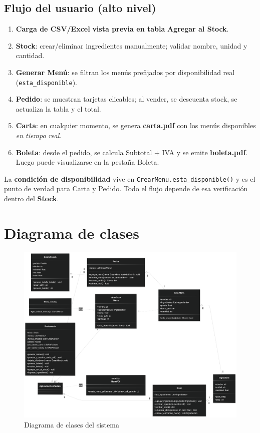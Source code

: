 \documentclass[12pt,a4paper]{article}
\newcommand{\codehl}[1]{\colorbox{yellow!30}{\texttt{#1}}}
\begin{document}
\subsection*{Flujo del usuario (alto nivel)}
\begin{enumerate}[leftmargin=*]
  \item \textbf{Carga de CSV/Excel} \rightarrow \textbf{vista previa en tabla} \rightarrow \textbf{Agregar al Stock}.
  \item \textbf{Stock}: crear/eliminar ingredientes manualmente; validar nombre, unidad y cantidad.
  \item \textbf{Generar Menú}: se filtran los menús prefijados por disponibilidad real (\texttt{esta\_disponible}).
  \item \textbf{Pedido}: se muestran tarjetas clicables; al vender, se descuenta stock, se actualiza la tabla y el total.
  \item \textbf{Carta}: en cualquier momento, se genera \textbf{carta.pdf} con los menús disponibles \textit{en tiempo real}.
  \item \textbf{Boleta}: desde el pedido, se calcula Subtotal + IVA y se emite \textbf{boleta.pdf}. Luego puede visualizarse en la pestaña Boleta.
\end{enumerate}

\begin{tcolorbox}[colback=yellow!8,colframe=yellow!40!black,title=\large Highlight del flujo]
La \textbf{condición de disponibilidad} vive en \codehl{CrearMenu.esta\_disponible()} y es el punto de verdad para Carta y Pedido. Todo el flujo depende de esa verificación dentro del \textbf{Stock}.
\end{tcolorbox}
\newpage

\section{Diagrama de clases}
\begin{figure}[H]
  \centering
  \includegraphics[width=\textwidth]{diagramaclases}
  \caption{Diagrama de clases del sistema}
  \label{fig:diagrama_clases}
\end{figure}
\end{document}
